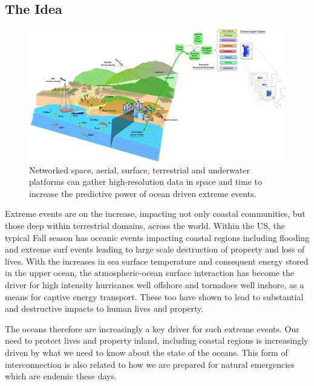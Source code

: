 \subsection*{The Idea}

\begin{figure}
  \centering
  \includegraphics[scale=0.30]{fig/Coastal-connect.jpg}
  \caption{Networked space, aerial, surface, terrestrial and underwater
    platforms can gather high-resolution data in space and time to
    increase the predictive power of ocean driven extreme events.}
  \label{fig:coastal-res}
\end{figure}

Extreme events are on the increase, impacting not only coastal
communities, but those deep within terrestrial domains, across the
world. Within the US, the typical Fall season has oceanic events
impacting coastal regions including flooding and extreme surf events
leading to large scale destruction of property and loss of lives. With
the increases in sea surface temperature and consequent energy stored
in the upper ocean, the atmospheric-ocean surface interaction has
become the driver for high intensity hurricanes well offshore and
tornadoes well inshore, as a means for captive energy transport. These
too have shown to lead to substantial and destructive impacts to human
lives and property. 

The oceans therefore are increasingly a key driver for such extreme
events. Our need to protect lives and property inland, including
coastal regions is increasingly driven by what we need to know about
the state of the oceans. This form of interconnection is also related
to how we are prepared for natural emergencies which are endemic these
days.


